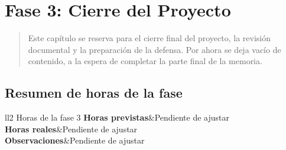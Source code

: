 \chapter{Fase 3: Cierre del Proyecto}

\begin{abstract}
Este capítulo se reserva para el cierre final del proyecto, la revisión documental y la preparación
de la defensa. Por ahora se deja vacío de contenido, a la espera de completar la parte final de la memoria.
\end{abstract}

\section{Resumen de horas de la fase}

\begin{table}[htb]
	\centering
	\begin{coolTable}{ll}{2}
{Horas de la fase 3}
	\textbf{Horas previstas}&Pendiente de ajustar\\
	\textbf{Horas reales}&Pendiente de ajustar\\
	\textbf{Observaciones}&Pendiente de ajustar\\
	\end{coolTable}
	\caption{Resumen de horas de la Fase 3}
\end{table}
